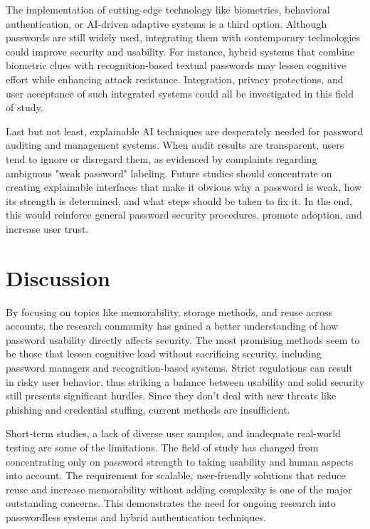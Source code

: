 \documentclass[12pt,a4paper]{article}
\begin{document}
\vspace{0.4cm}

The implementation of cutting-edge technology like biometrics, behavioral authentication, or AI-driven adaptive systems is a third option. Although passwords are still widely used, integrating them with contemporary technologies could improve security and usability. For instance, hybrid systems that combine biometric clues with recognition-based textual passwords may lessen cognitive effort while enhancing attack resistance. Integration, privacy protections, and user acceptance of such integrated systems could all be investigated in this field of study.

\vspace{0.4cm}

Last but not least, explainable AI techniques are desperately needed for password auditing and management systems. When audit results are transparent, users tend to ignore or disregard them, as evidenced by complaints regarding ambiguous "weak password" labeling. Future studies should concentrate on creating explainable interfaces that make it obvious why a password is weak, how its strength is determined, and what steps should be taken to fix it. In the end, this would reinforce general password security procedures, promote adoption, and increase user trust.


\section{Discussion}

By focusing on topics like memorability, storage methods, and reuse across accounts, the research community has gained a better understanding of how password usability directly affects security. The most promising methods seem to be those that lessen cognitive load without sacrificing security, including password managers and recognition-based systems.
Strict regulations can result in risky user behavior, thus striking a balance between usability and solid security still presents significant hurdles. Since they don't deal with new threats like phishing and credential stuffing, current methods are insufficient.

\vspace{0.4cm}

Short-term studies, a lack of diverse user samples, and inadequate real-world testing are some of the limitations. The field of study has changed from concentrating only on password strength to taking usability and human aspects into account.
The requirement for scalable, user-friendly solutions that reduce reuse and increase memorability without adding complexity is one of the major outstanding concerns. This demonstrates the need for ongoing research into passwordless systems and hybrid authentication techniques.
\end{document}
